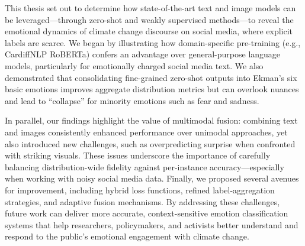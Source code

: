 This thesis set out to determine how state-of-the-art text and image models can be leveraged—through zero-shot and weakly supervised methods—to reveal the emotional dynamics of climate change discourse on social media, where explicit labels are scarce. We began by illustrating how domain-specific pre-training (e.g., CardiffNLP RoBERTa) confers an advantage over general-purpose language models, particularly for emotionally charged social media text. We also demonstrated that consolidating fine-grained zero-shot outputs into Ekman’s six basic emotions improves aggregate distribution metrics but can overlook nuances and lead to “collapse” for minority emotions such as fear and sadness. 
\newline

In parallel, our findings highlight the value of multimodal fusion: combining text and images consistently enhanced performance over unimodal approaches, yet also introduced new challenges, such as overpredicting surprise when confronted with striking visuals. These issues underscore the importance of carefully balancing distribution-wide fidelity against per-instance accuracy—especially when working with noisy social media data. Finally, we proposed several avenues for improvement, including hybrid loss functions, refined label-aggregation strategies, and adaptive fusion mechanisms. By addressing these challenges, future work can deliver more accurate, context-sensitive emotion classification systems that help researchers, policymakers, and activists better understand and respond to the public’s emotional engagement with climate change.